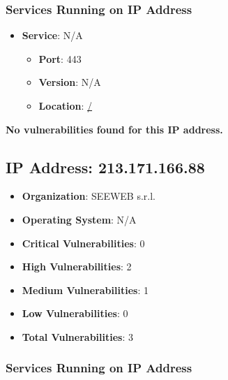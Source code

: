 \documentclass{article}
\begin{document}
\subsubsection*{Services Running on IP Address}

\begin{itemize}
    
        \item \textbf{Service}: N/A
        \begin{itemize}
            \item \textbf{Port}: 443
            \item \textbf{Version}:  N/A 
            \item \textbf{Location}: \href{ / }{ / }
        \end{itemize}
    
\end{itemize}


\textbf{No vulnerabilities found for this IP address.}




\clearpage



\subsection*{IP Address: 213.171.166.88}

\begin{itemize}
    \item \textbf{Organization}: SEEWEB s.r.l.
    \item \textbf{Operating System}:  N/A 
    \item \textbf{Critical Vulnerabilities}: 0
    \item \textbf{High Vulnerabilities}: 2
    \item \textbf{Medium Vulnerabilities}: 1
    \item \textbf{Low Vulnerabilities}: 0
    \item \textbf{Total Vulnerabilities}: 3
\end{itemize}

\subsubsection*{Services Running on IP Address}
\end{document}
